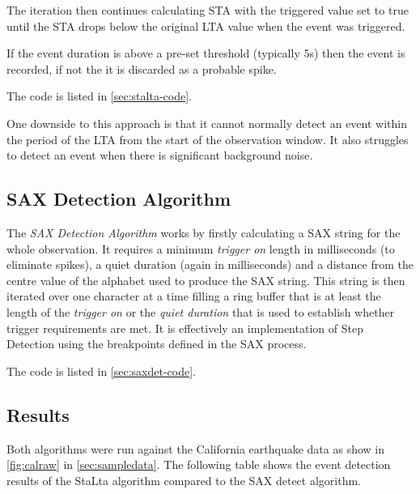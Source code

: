 \documentclass[../report.tex]{subfiles}
\begin{document}
	The iteration then continues calculating STA with the triggered value set to true until the STA drops below the original LTA value when the event was triggered.
	
	If the event duration is above a pre-set threshold (typically 5s) then the event is recorded, if not the it is discarded as a probable spike.
	
	The code is listed in \cref{sec:stalta-code}.

	One downside to this approach is that it cannot normally detect an event within the period of the LTA from the start of the observation window.  It also struggles to detect an event when there is significant background noise. 
	
\subsection{SAX Detection Algorithm} \label{sec:sax-detect}

	The \textit{SAX Detection Algorithm} works by firstly calculating a SAX string for the whole observation.  It requires a minimum \textit{trigger on} length in milliseconds (to eliminate spikes), a quiet duration (again in milliseconds) and a distance from the centre value of the alphabet used to produce the SAX string.  This string is then iterated over one character at a time filling a ring buffer that is at least the length of the \textit{trigger on} or the \textit{quiet duration} that is used to establish whether trigger requirements are met.  It is effectively an implementation of Step Detection using the breakpoints defined in the SAX process.
	
	The code is listed in \cref{sec:saxdet-code}.

\subsection{Results}
	Both algorithms were run against the California earthquake data as show in \cref{fig:calraw} in \cref{sec:sampledata}.  The following table shows the event detection results of the StaLta algorithm compared to the SAX detect algorithm.

\begin{center}
	\\
\end{center}
\end{document}
